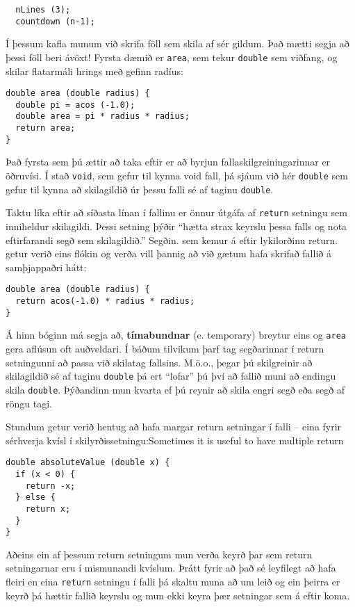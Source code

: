 \begin{verbatim}
  nLines (3);
  countdown (n-1);
\end{verbatim}
%
Í þessum kafla munum við skrifa föll sem skila af sér gildum.
Það mætti segja að þessi föll beri ávöxt!
Fyrsta dæmið er {\tt area}, sem tekur {\tt double} sem viðfang, og skilar flatarmáli hrings með gefinn radíus:


\begin{verbatim}
double area (double radius) {
  double pi = acos (-1.0);
  double area = pi * radius * radius;
  return area;
}
\end{verbatim}
%
Það fyrsta sem þú ættir að taka eftir er að byrjun fallaskilgreiningarinnar er öðruvísi.
Í stað {\tt void}, sem gefur til kynna void fall, þá sjáum við hér {\tt double} sem gefur til kynna að skilagildið úr þessu falli sé af taginu {\tt double}.

Taktu líka eftir að síðasta línan í fallinu er önnur útgáfa af {\tt return} setningu sem inniheldur skilagildi.
Þessi setning þýðir ``hætta strax keyrslu þessa falls og nota eftirfarandi segð sem skilagildið.''
Segðin. sem kemur á eftir lykilorðinu return. getur verið eins flókin og verða vill þannig að við gætum hafa skrifað fallið á samþjappaðri hátt:

\begin{verbatim}
double area (double radius) {
  return acos(-1.0) * radius * radius;
}
\end{verbatim}
%
Á hinn bóginn má segja að, {\bf tímabundnar} (e. temporary) breytur eins og {\tt area} gera aflúsun oft auðveldari.
Í báðum tilvikum þarf tag segðarinnar í return setningunni að passa við skilatag fallsins.
M.ö.o., þegar þú skilgreinir að skilagildið sé af taginu {\tt double} þá ert ``lofar'' þú því að fallið muni að endingu skila {\tt double}.
Þýðandinn mun kvarta ef þú reynir að skila engri segð eða segð af röngu tagi. 


Stundum getur verið hentug að hafa margar return setningar í falli -- eina fyrir sérhverja kvísl í skilyrðissetningu:Sometimes it is useful to have multiple return

\begin{verbatim}
double absoluteValue (double x) {
  if (x < 0) {
    return -x;
  } else {
    return x;
  }
}
\end{verbatim}
%
Aðeins ein af þessum return setningum mun verða keyrð þar sem return setningarnar eru í mismunandi kvíslum.
Þrátt fyrir að það sé leyfilegt að hafa fleiri en eina {\tt return} setningu í falli þá skaltu muna að um leið og ein þeirra er keyrð þá hættir fallið keyrslu og mun ekki keyra þær setningar sem á eftir koma.

